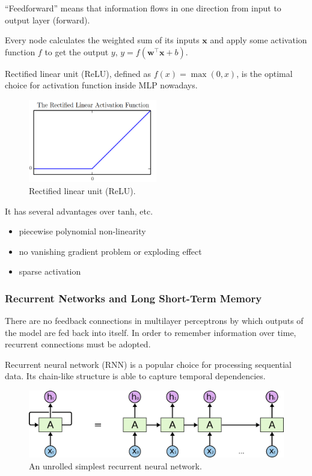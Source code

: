 \documentclass[11pt,a4paper,titlepage]{article}
\begin{document}
\enquote{Feedforward} means that information flows in one direction from input to output layer (forward).

Every node calculates the weighted sum of its inputs \(\mathbf{x}\) and apply some activation function \(f\) to get the output \(y\), \( y = f (\mathbf{w}^\intercal \mathbf{x} + b) \).

Rectified linear unit (ReLU), defined as \(f(x) = \max(0, x)\), is the optimal choice for activation function inside MLP nowadays.

\begin{figure}[htbp]
  \centering
  \includegraphics[width=0.5\textwidth]{relu.png}
  \caption{Rectified linear unit (ReLU).} \label{fig:relu}
\end{figure}

It has several advantages over \(\mathrm{tanh}\), etc.

\begin{itemize}
  \item piecewise polynomial non-linearity
  \item no vanishing gradient problem or exploding effect
  \item sparse activation
\end{itemize}

\subsubsection{Recurrent Networks and Long Short-Term Memory}

There are no feedback connections in multilayer perceptrons by which outputs of the model are fed back into itself.
In order to remember information over time, recurrent connections must be adopted.

Recurrent neural network (RNN) is a popular choice for processing sequential data.
Its chain-like structure is able to capture temporal dependencies.

\begin{figure}[htbp]
  \centering
  \includegraphics[width=\textwidth]{RNN-unrolled.png}
  \caption{An unrolled simplest recurrent neural network.} \label{fig:rnn-intro}
\end{figure}
\end{document}
